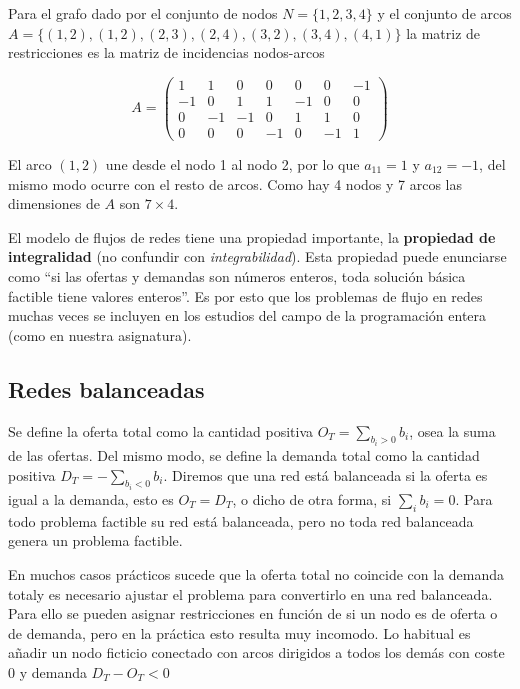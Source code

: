 \begin{ejemplo}
    Para el grafo dado por el conjunto de nodos $N=\{1,2,3,4\}$ y el conjunto de arcos 
    $A=\{(1,2),(1,2),(2,3),(2,4),(3,2),(3,4),(4,1)\}$ la matriz de restricciones es la matriz de incidencias nodos-arcos

    \[A=\begin{pmatrix}
         1 &  1 &  0 &  0 &  0 &  0 & -1 \\
        -1 &  0 &  1 &  1 & -1 &  0 &  0 \\
         0 & -1 & -1 &  0 &  1 &  1 &  0 \\
         0 &  0 &  0 & -1 &  0 & -1 &  1
    \end{pmatrix}\]

    \noindent El arco $(1,2)$ une desde el nodo 1 al nodo 2, por lo que $a_{11}=1$ y $a_{12}=-1$, del mismo modo ocurre con 
    el resto de arcos. Como hay 4 nodos y 7 arcos las dimensiones de $A$ son $7\times 4$.
\end{ejemplo}

El modelo de flujos de redes tiene una propiedad importante, la \textbf{propiedad de integralidad} (no confundir con 
\textit{integrabilidad}). Esta propiedad puede enunciarse como ``si las ofertas y demandas son números enteros, toda solución
básica factible tiene valores enteros''. Es por esto que los problemas de flujo en redes muchas veces se incluyen en los
estudios del campo de la programación entera (como en nuestra asignatura).

\subsection{Redes balanceadas}

Se define la oferta total como la cantidad positiva $O_T=\sum_{b_i>0}b_i$, osea la suma de las ofertas. Del mismo modo,
se define la demanda total como la cantidad positiva $D_T=-\sum_{b_i<0}b_i$. Diremos que una red está balanceada si la oferta
es igual a la demanda, esto es $O_T=D_T$, o dicho de otra forma, si $\sum_ib_i=0$. Para todo problema factible su red está
balanceada, pero no toda red balanceada genera un problema factible.

\vspace*{2mm}

En muchos casos prácticos sucede que la oferta total no coincide con la demanda totaly es necesario ajustar el
problema para convertirlo en una red balanceada. Para ello se pueden asignar restricciones en función de si un nodo es de
oferta o de demanda, pero en la práctica esto resulta muy incomodo. Lo habitual es añadir un nodo ficticio conectado con arcos
dirigidos a todos los demás con coste 0 y demanda $D_T-O_T<0$

